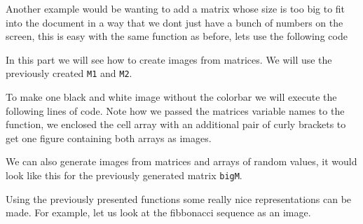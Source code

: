
Another example would be wanting to add a matrix whose size is too big to fit into the document in a way that we 
dont just have a bunch of numbers on the screen, this is easy with the same function as before, lets use the following code
 

In this part we will see how to create images from matrices. We will use the previously created {\tt M1} and {\tt M2}.


To make one black and white image without the colorbar we will execute the following lines of code. Note how we passed the 
matrices variable names to the function, we enclosed the cell array with an additional pair of curly brackets to get one 
figure containing both arrays as images.


We can also generate images from matrices and arrays of random values, it would look like this for the previously generated
matrix {\tt bigM}.


Using the previously presented functions some really nice representations can be made. For example, let us look at the fibbonacci 
sequence as an image.







